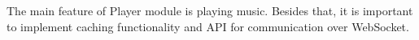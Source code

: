 The main feature of Player module is playing music. Besides that, it is important to implement caching functionality and API for communication over WebSocket.


